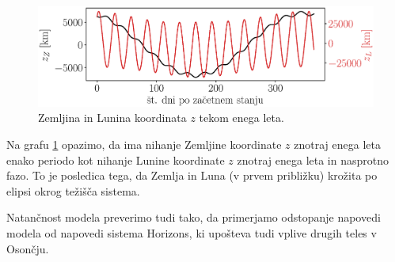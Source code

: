 \documentclass[a4paper,12pt]{article}
\begin{document}
\newpage

\begin{figure}[ht]
    \centering
    \includegraphics[scale=0.53]{slikep/koordinatez.eps}
    \caption{Zemljina in Lunina koordinata $z$ tekom enega leta.}
    \label{fig:zemlja-luna}
\end{figure}

\noindent
Na grafu \ref{fig:zemlja-luna} opazimo, da ima nihanje Zemljine koordinate $z$ 
znotraj enega leta enako periodo kot nihanje Lunine koordinate $z$ znotraj 
enega leta in nasprotno fazo. To je posledica tega, da Zemlja in Luna (v prvem 
približku) krožita po elipsi okrog težišča sistema.

Natančnost modela preverimo tudi tako, da primerjamo odstopanje napovedi modela 
od napovedi sistema Horizons, ki upošteva tudi vplive drugih teles v Osončju.
\end{document}
